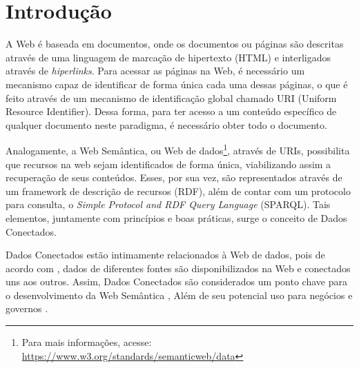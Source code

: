 \chapter{Introdução}
\label{cap:introducao}
A Web é baseada em documentos, onde os documentos ou páginas são descritas através de uma linguagem de marcação de hipertexto (HTML) e interligados através de \textit{hiperlinks}. Para acessar as páginas na Web, é necessário um mecanismo capaz de identificar de forma única cada uma dessas páginas, o que é feito através de um mecanismo de identificação global chamado URI (Uniform Resource Identifier). Dessa forma, para ter acesso a um conteúdo específico de qualquer documento neste paradigma, é necessário obter todo o documento.

Analogamente, a Web Semântica, ou Web de dados\footnote{Para mais informações, acesse: \url{https://www.w3.org/standards/semanticweb/data}}, através de URIs, possibilita que recursos na web sejam identificados de forma única, viabilizando assim a recuperação de seus conteúdos. Esses, por sua vez, são representados através de um framework de descrição de recursos (RDF), além de contar com um protocolo para consulta, o \textit{Simple Protocol and RDF Query Language} (SPARQL). Tais elementos, juntamente com princípios e boas práticas, surge o conceito de Dados Conectados.

 
Dados Conectados estão intimamente relacionados à Web de dados, pois de acordo com , dados de diferentes fontes são disponibilizados na Web e conectados uns aos outros. Assim, Dados Conectados são considerados um ponto chave para o desenvolvimento da Web Semântica \cite{berners2001semantic}, Além de seu potencial uso para negócios e governos \cite{Isotani2015}.  

